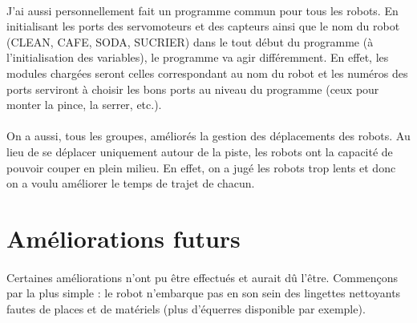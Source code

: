 \documentclass[12pt,oneside,a4paper]{book}
\begin{document}
	\paragraph{} J'ai aussi personnellement fait un programme commun pour tous les robots. En initialisant les ports des servomoteurs et des capteurs ainsi que le nom du robot (CLEAN, CAFE, SODA, SUCRIER) dans le tout début du programme (à l'initialisation des variables), le programme va agir différemment. En effet, les modules chargées seront celles correspondant au nom du robot et les numéros des ports serviront à choisir les bons ports au niveau du programme (ceux pour monter la pince, la serrer, etc.).
	\paragraph{} On a aussi, tous les groupes, améliorés la gestion des déplacements des robots. Au lieu de se déplacer uniquement autour de la piste, les robots ont la capacité de pouvoir couper en plein milieu. En effet, on a jugé les robots trop lents et donc on a voulu améliorer le temps de trajet de chacun.

\section{Améliorations futurs}
	\paragraph{} Certaines améliorations n'ont pu être effectués et aurait dû l'être. Commençons par la plus simple : le robot n'embarque pas en son sein des lingettes nettoyants fautes de places et de matériels (plus d'équerres disponible par exemple).
\end{document}
